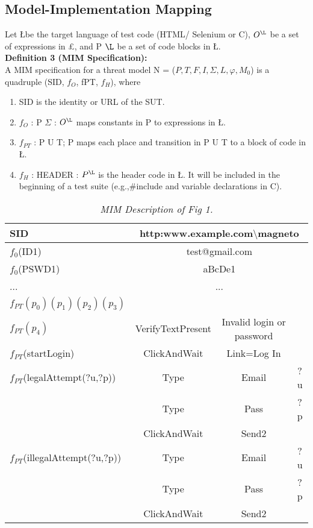 \subsection{Model-Implementation Mapping}
Let \L be the target language of test code (HTML/
Selenium or C), $O^{\L}$ be a set of expressions in £, and P $\L$ be a set of code blocks in \L.
\\
\textbf{Definition 3 (MIM Specification):} 
\\ A MIM specification for a
threat model N = ($P,T,F,I,\Sigma,L,\varphi,M_0$) is a quadruple
(SID, $f_O$, fPT, $f_H$), where
\begin{enumerate}
\item SID is the identity or URL of the SUT.
\item $f_O$ : P $\Sigma$ : $O^{\L}$ maps constants in P to expressions
in \L.
\item $f_{PT}$ : P U T; P maps each place and transition in
P U T to a block of code in \L.
\item  $f_H$ : HEADER : $P^{\L}$ is the header code in \L. It
will be included in the beginning of a test suite (e.g.,\#include and variable declarations in C).
\end{enumerate}
\begin{table}
\label{table:1}
\centering
\begin{tabular}{|l|c|c|c|}
\hline
SID&\multicolumn{3}{c|}{http:www.example.com$\setminus$magneto}
\\
\hline
$f_0$(ID1) & \multicolumn{3}{c|}{test@gmail.com}
\\
\hline
$f_0$(PSWD1) & \multicolumn{3}{c|}{aBcDe1}
\\
\hline
... & \multicolumn{3}{c|}{...}
\\
\cline{1-4}
$f_{PT}(p_0)(p_1)(p_2)(p_3)$ & & &\\
\hline
$f_{PT}(p_4)$ & VerifyTextPresent & Invalid login or password & 
\\
\hline
$f_{PT}$(startLogin) & ClickAndWait & Link=Log In & 
\\
\hline
$f_{PT}$(legalAttempt(?u,?p)) & Type & Email & ?u
\\
\cline{2-4}
 & Type & Pass & ?p
 \\
 \cline{2-4}
 & ClickAndWait & Send2 &
\\
\hline
$f_{PT}$(illegalAttempt(?u,?p)) & Type & Email & ?u
\\
\cline{2-4}
 & Type & Pass & ?p
\\
\cline{2-4}
 & ClickAndWait & Send2 &
\\
\hline
\end{tabular}
\caption{\textit{MIM Description of Fig 1.}}
\end{table}
